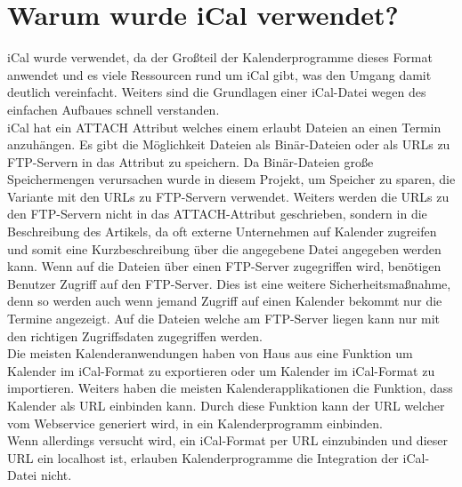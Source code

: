 \section{Warum wurde iCal verwendet?}
\label{sec:warumWurdeiCalVerwendet?}
iCal wurde verwendet, da der Großteil der Kalenderprogramme dieses Format anwendet und es viele Ressourcen rund um iCal gibt, was den Umgang damit deutlich vereinfacht. Weiters sind die Grundlagen einer iCal-Datei wegen des einfachen Aufbaues schnell verstanden.\\
iCal hat ein ATTACH Attribut welches einem erlaubt Dateien an einen Termin anzuhängen. Es gibt die Möglichkeit Dateien als Binär-Dateien oder als URLs zu FTP-Servern in das Attribut zu speichern. Da Binär-Dateien große Speichermengen verursachen wurde in diesem Projekt, um Speicher zu sparen, die Variante mit den URLs zu FTP-Servern verwendet. Weiters werden die URLs zu den FTP-Servern nicht in das ATTACH-Attribut geschrieben, sondern in die Beschreibung des Artikels, da oft externe Unternehmen auf Kalender zugreifen und somit eine Kurzbeschreibung über die angegebene Datei angegeben werden kann. Wenn auf die Dateien über einen FTP-Server zugegriffen wird, benötigen Benutzer Zugriff auf den FTP-Server. Dies ist eine weitere Sicherheitsmaßnahme, denn so werden auch wenn jemand Zugriff auf einen Kalender bekommt nur die Termine angezeigt. Auf die Dateien welche am FTP-Server liegen kann nur mit den richtigen Zugriffsdaten zugegriffen werden.\\
Die meisten Kalenderanwendungen haben von Haus aus eine Funktion um Kalender im iCal-Format zu exportieren oder um Kalender im iCal-Format zu importieren. Weiters haben die meisten Kalenderapplikationen die Funktion, dass Kalender als URL einbinden kann. Durch diese Funktion kann der URL welcher vom Webservice generiert wird, in ein Kalenderprogramm einbinden.
\\
Wenn allerdings versucht wird, ein iCal-Format per URL einzubinden und dieser URL ein localhost ist, erlauben Kalenderprogramme die Integration der iCal-Datei nicht.

